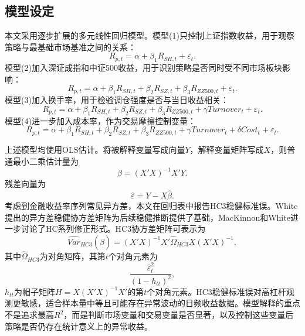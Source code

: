 \documentclass[UTF8,a4paper,12pt]{ctexart}
\begin{document}
\subsection{模型设定}
本文采用逐步扩展的多元线性回归模型。模型(1)只控制上证指数收益，用于观察策略与最基础市场基准之间的关系：
\begin{equation}
R_{p,t}=\alpha+\beta_1R_{SH,t}+\varepsilon_t .
\end{equation}
模型(2)加入深证成指和中证500收益，用于识别策略是否同时受不同市场板块影响：
\begin{equation}
R_{p,t}=\alpha+\beta_1R_{SH,t}+\beta_2R_{SZ,t}+\beta_3R_{ZZ500,t}+\varepsilon_t .
\end{equation}
模型(3)加入换手率，用于检验调仓强度是否与当日收益相关：
\begin{equation}
R_{p,t}=\alpha+\beta_1R_{SH,t}+\beta_2R_{SZ,t}+\beta_3R_{ZZ500,t}+\gamma Turnover_t+\varepsilon_t .
\end{equation}
模型(4)进一步加入成本率，作为交易摩擦控制变量：
\begin{equation}
R_{p,t}=\alpha+\beta_1R_{SH,t}+\beta_2R_{SZ,t}+\beta_3R_{ZZ500,t}+\gamma Turnover_t+\delta Cost_t+\varepsilon_t .
\end{equation}

上述模型均使用OLS估计。将被解释变量写成向量$Y$，解释变量矩阵写成$X$，则普通最小二乘估计量为
\begin{equation}
\hat{\beta}=(X'X)^{-1}X'Y.
\end{equation}
残差向量为
\begin{equation}
\hat{\varepsilon}=Y-X\hat{\beta}.
\end{equation}
考虑到金融收益率序列常见异方差，本文在回归表中报告HC3稳健标准误。White提出的异方差稳健协方差矩阵为后续稳健推断提供了基础\cite{white1980}，MacKinnon和White进一步讨论了HC系列修正形式\cite{mackinnon1985}。HC3协方差矩阵可表示为
\begin{equation}
\widehat{Var}_{HC3}(\hat{\beta})=(X'X)^{-1}X'\hat{\Omega}_{HC3}X(X'X)^{-1},
\end{equation}
其中$\hat{\Omega}_{HC3}$为对角矩阵，其第$t$个对角元素为
\begin{equation}
\frac{\hat{\varepsilon}_t^2}{(1-h_{tt})^2},
\end{equation}
$h_{tt}$为帽子矩阵$H=X(X'X)^{-1}X'$的第$t$个对角元素。HC3稳健标准误对高杠杆观测更敏感，适合样本量中等且可能存在异常波动的日频收益数据。模型解释的重点不是追求最高$R^2$，而是判断市场变量和交易变量是否显著，以及控制这些变量后策略是否仍存在统计意义上的异常收益。
\end{document}
